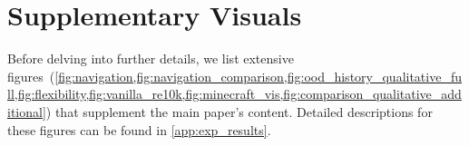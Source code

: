 \section*{Supplementary Visuals}

Before delving into further details, we list extensive figures~(\cref{fig:navigation,fig:navigation_comparison,fig:ood_history_qualitative_full,fig:flexibility,fig:vanilla_re10k,fig:minecraft_vis,fig:comparison_qualitative_additional}) that supplement the main paper's content. Detailed descriptions for these figures can be found in \cref{app:exp_results}.








\setfancyheader{}
\clearpage
